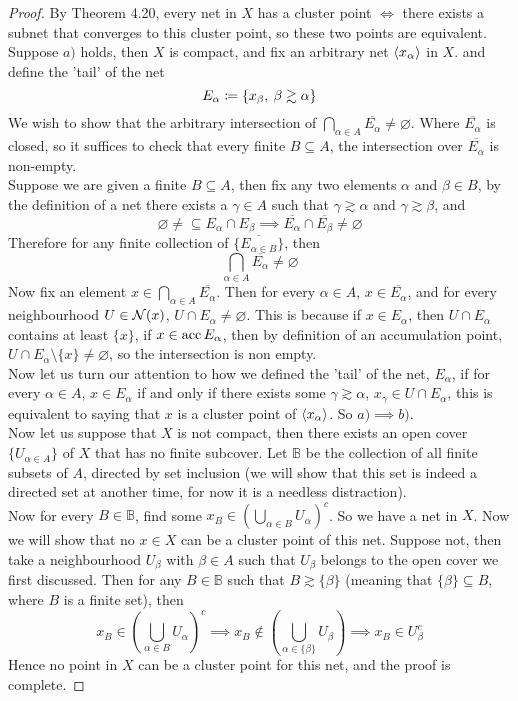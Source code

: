 \documentclass[../../main.tex]{subfiles}
\begin{document}
\begin{proof}
By Theorem 4.20, every net in $X$ has a cluster point $\iff$ there exists a subnet that converges to this cluster point, so these two points are equivalent. \\

Suppose $a)$ holds, then $X$ is compact, and fix an arbitrary net $\langle {x_\alpha} \rangle$ in $X$. and define the 'tail' of the net 
\[
E_\alpha\coloneqq\{x_\beta,\:\beta\gtrsim\alpha\}
\]
We wish to show that the arbitrary intersection of $\bigcap_{\alpha\in A}\overline{E_\alpha}\neq\varnothing$. Where $\overline{E_\alpha}$ is closed, so it suffices to check that every finite $B\subseteq A$, the intersection over $\overline{E_\alpha}$ is non-empty.\\

Suppose we are given a finite $B\subseteq A$, then fix any two elements $\alpha$ and $\beta\in B$, by the definition of a net there exists a $\gamma\in A$ such that $\gamma\gtrsim\alpha$ and $\gamma\gtrsim\beta$, and
\[
\varnothing\neq\subseteq E_\alpha\cap E_\beta\implies \overline{E_\alpha}\cap\overline{E_\beta}\neq\varnothing
\]
Therefore for any finite collection of $\{\overline{E_{\alpha\in B}}\}$, then 
\[
\bigcap_{\alpha\in A}\overline{E_\alpha}\neq\varnothing
\]
Now fix an element $x\in \bigcap_{\alpha\in A}\overline{E_\alpha}$. Then for every $\alpha\in A$, $x\in \overline{E_\alpha}$, and for every neighbourhood $U\in\mathcal{N}({x})$, $U\cap E_\alpha\neq\varnothing$. This is because if $x\in E_\alpha$, then $U\cap E_\alpha$ contains at least $\{x\}$, if $x\in\operatorname{acc}{E_\alpha}$, then by definition of an accumulation point, $U\cap E_\alpha\setminus\{x\}\neq\varnothing$, so the intersection is non empty.\\

Now let us turn our attention to how we defined the 'tail' of the net, $E_\alpha$, if for every $\alpha\in A$, $x\in E_\alpha$ if and only if there exists some $\gamma\gtrsim\alpha$, $x_\gamma\in U\cap E_\alpha$, this is equivalent to saying that $x$ is a cluster point of $\langle {x_\alpha} \rangle$. So $a)\implies b)$.\\

Now let us suppose that $X$ is not compact, then there exists an open cover $\{U_{\alpha\in A}\}$ of $X$ that has no finite subcover. Let $\mathbb{B}$ be the collection of all finite subsets of $A$, directed by set inclusion (we will show that this set is indeed a directed set at another time, for now it is a needless distraction).\\

Now for every $B\in\mathbb{B}$, find some $x_B\in \left(\bigcup_{\alpha\in B} U_\alpha\right)^c$. So we have a net in $X$. Now we will show that no $x\in X$ can be a cluster point of this net. Suppose not, then take a neighbourhood $U_\beta$ with $\beta\in A$ such that $U_\beta$ belongs to the open cover we first discussed. Then for any $B\in \mathbb{B}$ such that $B\gtrsim\{\beta\}$ (meaning that $\{\beta\}\subseteq B$, where $B$ is a finite set), then
\[
x_B\in\left(\bigcup_{\alpha\in B}U_\alpha\right)^c\implies x_B\notin\left(\bigcup_{\alpha\in \{\beta\}}U_\beta\right)\implies x_B\in U_\beta^c
\]
Hence no point in $X$ can be a cluster point for this net, and the proof is complete.
\end{proof}
\end{document}
